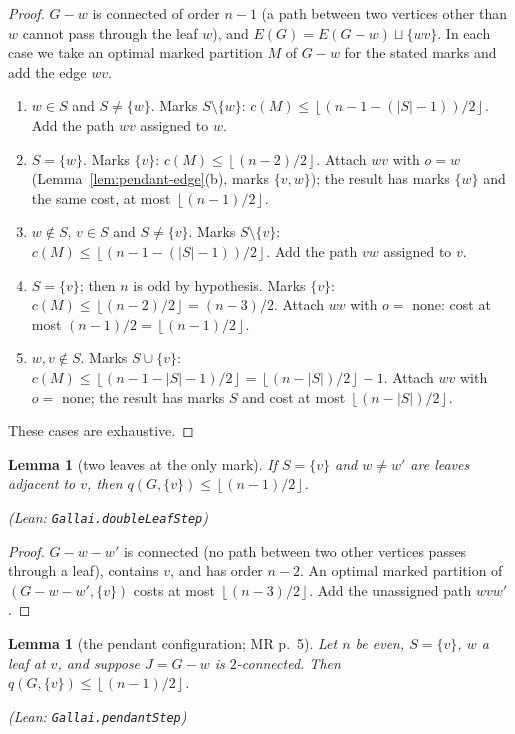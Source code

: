 \documentclass[11pt]{amsart}
\newtheorem{lemma}[theorem]{Lemma}
\theoremstyle{definition}
\theoremstyle{remark}
\renewcommand{\_}{\oldunderscore\allowbreak}
\newcommand{\leanst}[1]{\par{\raggedright\small\textup{(Lean: \texttt{#1})}\par}}
\newcommand{\fl}[1]{\left\lfloor #1\right\rfloor}
\begin{document}
\begin{proof}
$G-w$ is connected of order $n-1$ (a path between two vertices other than $w$ cannot pass through
the leaf $w$), and $E(G)=E(G-w)\sqcup\{wv\}$. In each case we take an optimal
marked partition $M$ of $G-w$ for the stated marks and add the edge $wv$.
\begin{enumerate}[label=(L\arabic*),leftmargin=3em]
\item $w\in S$ and $S\ne\{w\}$. Marks $S\setminus\{w\}$: $c(M)\le\fl{(n-1-(|S|-1))/2}$. Add the path
$wv$ assigned to $w$.
\item $S=\{w\}$. Marks $\{v\}$: $c(M)\le\fl{(n-2)/2}$. Attach $wv$ with $o=w$
(Lemma~\ref{lem:pendant-edge}(b), marks $\{v,w\}$); the result has marks $\{w\}$ and the same cost,
at most $\fl{(n-1)/2}$.
\item $w\notin S$, $v\in S$ and $S\ne\{v\}$. Marks $S\setminus\{v\}$:
$c(M)\le\fl{(n-1-(|S|-1))/2}$. Add the path $vw$ assigned to $v$.
\item $S=\{v\}$; then $n$ is odd by hypothesis. Marks $\{v\}$: $c(M)\le\fl{(n-2)/2}=(n-3)/2$.
Attach $wv$ with $o=$ none: cost at most $(n-1)/2=\fl{(n-1)/2}$.
\item $w,v\notin S$. Marks $S\cup\{v\}$: $c(M)\le\fl{(n-1-|S|-1)/2}=\fl{(n-|S|)/2}-1$. Attach $wv$
with $o=$ none; the result has marks $S$ and cost at most $\fl{(n-|S|)/2}$.
\end{enumerate}
These cases are exhaustive.
\end{proof}

\begin{lemma}[two leaves at the only mark]\label{lem:doubleleaf}
If $S=\{v\}$ and $w\ne w'$ are leaves adjacent to $v$, then $q(G,\{v\})\le\fl{(n-1)/2}$.
\leanst{Gallai.doubleLeafStep}
\end{lemma}

\begin{proof}
$G-w-w'$ is connected (no path between two other vertices passes through a leaf), contains $v$, and
has order $n-2$. An optimal marked partition of
$(G-w-w',\{v\})$ costs at most $\fl{(n-3)/2}$. Add the unassigned path $wvw'$.
\end{proof}

\begin{lemma}[the pendant configuration; MR p.~5]\label{lem:pendant}
Let $n$ be even, $S=\{v\}$, $w$ a leaf at $v$, and suppose $J=G-w$ is $2$-connected. Then
$q(G,\{v\})\le\fl{(n-1)/2}$.
\leanst{Gallai.pendantStep}
\end{lemma}
\end{document}

